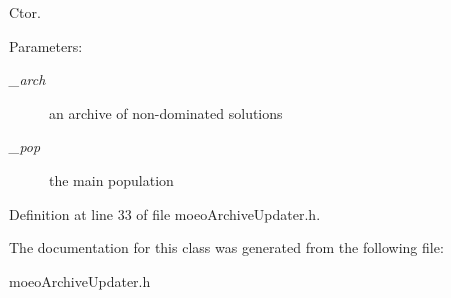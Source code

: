 Ctor. 

\begin{Desc}
\item[Parameters:]
\begin{description}
\item[{\em \_\-arch}]an archive of non-dominated solutions \item[{\em \_\-pop}]the main population \end{description}
\end{Desc}


Definition at line 33 of file moeo\-Archive\-Updater.h.

The documentation for this class was generated from the following file:\begin{CompactItemize}
\item 
moeo\-Archive\-Updater.h\end{CompactItemize}
